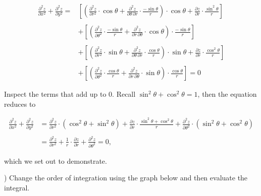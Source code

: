 \documentclass{article}
\begin{document}
\begin{align*}\frac{\partial^2 z}{\partial x^2}+\frac{\partial^2 z}{\partial y^2}=&\left[\left(\frac{\partial^2z}{\partial r^2}\cdot\cos\theta +\frac{\partial^2z}{\partial\theta\,\partial r}\cdot\frac{-\sin\theta}{r}\right)\cdot\cos\theta+\frac{\partial z}{\partial r}\cdot\frac{\sin^2\theta}{r}\right]\\\\&+\left[\left(\frac{\partial^2z}{\partial\theta^2}\cdot\frac{-\sin\theta}{r} + \frac{\partial^2z}{\partial r\,\partial\theta}\cdot\cos\theta\right)\cdot\frac{-\sin\theta}{r}\right]\\\\&+\left[\left(\frac{\partial^2z}{\partial r^2}\cdot\sin\theta +\frac{\partial^2z}{\partial\theta\,\partial r}\cdot\frac{\cos\theta}{r}\right)\cdot\sin\theta+\frac{\partial z}{\partial r}\cdot\frac{\cos^2\theta}{r}\right]\\\\&+\left[\left(\frac{\partial^2z}{\partial\theta^2}\cdot\frac{\cos\theta}{r} + \frac{\partial^2z}{\partial r\,\partial\theta}\cdot\sin\theta\right)\cdot\frac{\cos\theta}{r}\right]=0\end{align*}

\newpage

\noindent Inspect the terms that add up to $0$. Recall $\sin^2\theta+\cos^2\theta=1$, then the equation reduces to

\begin{align*}
\frac{\partial^2z}{\partial x^2}+\frac{\partial^2z}{\partial y^2}&=\frac{\partial^2z}{\partial r^2}\cdot\left(\cos^2\theta+\sin^2\theta\right)+\frac{\partial z}{\partial r}\cdot\frac{\sin^2\theta+\cos^2\theta}{r}+\frac{\partial^2z}{\partial\theta^2}\cdot\left(\sin^2\theta+\cos^2\theta\right)\\\\&=\frac{\partial^2z}{\partial r^2}+\frac1r\cdot\frac{\partial z}{\partial r}+\frac{\partial^2z}{\partial\theta^2}=0,
\end{align*}

\hfill

\noindent which we set out to demonstrate.

\hfill

) Change the order of integration using the graph below and then evaluate the integral.
\end{document}

